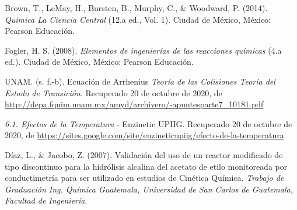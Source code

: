 \begin{thebibliography}{0}

    \bibitem{} Brown, T., LeMay, H., Bursten, B., Murphy, C., & Woodward, P. (2014).
    \textit{Quimica La Ciencia Central}
    (12.a ed., Vol. 1). Ciudad de México, México: Pearson Educación.

    \bibitem{} Fogler, H. S. (2008). \textit{Elementos de ingenierías de las reacciones químicas}
    (4.a ed.). Ciudad de México, México: Pearson Educación.

    \bibitem{} UNAM. (s. f.-b). Ecuación de Arrhenius 
    \textit{Teoría de las Colisiones Teoría del Estado de Transición}.
     Recuperado 20 de octubre de 2020, de \url{ http://depa.fquim.unam.mx/amyd/archivero/-apuntesparte7_10181.pdf}

    \bibitem{} \textit{6.1. Efectos de la Temperatura} - Enzinetic UPIIG. Recuperado 20 de octubre de 2020, de
    \url{ https://sites.google.com/site/enzineticupiig/efecto-de-la-temperatura}

    \bibitem{} Díaz, L., & Jacobo, Z. (2007). Validación del uso de un reactor modificado de tipo discontinuo para
    la hidrólisis alcalina del acetato de etilo monitoreada por conductimetría para 
    ser utilizado en estudios de Cinética Química. 
    \textit{Trabajo de Graduación Ing. Química Guatemala, Universidad de San Carlos de Guatemala, Facultad de Ingeniería}.


\end{thebibliography}